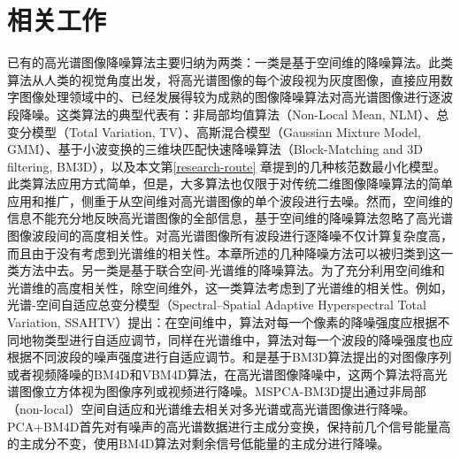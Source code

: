 \documentclass[12pt, a4paper]{article}
\begin{document}
\section{相关工作}\label{related-work}
\par 已有的高光谱图像降噪算法主要归纳为两类：一类是基于空间维的降噪算法。此类算法从人类的视觉角度出发，将高光谱图像的每个波段视为灰度图像，直接应用数字图像处理领域中的、已经发展得较为成熟的图像降噪算法对高光谱图像进行逐波段降噪。这类算法的典型代表有：非局部均值算法（Non-Local Mean, NLM）\cite{NLM}、总变分模型（Total Variation, TV）\cite{TV}、高斯混合模型（Gaussian Mixture Model, GMM）\cite{GMM}、基于小波变换的三维块匹配快速降噪算法（Block-Matching and 3D filtering, BM3D）\cite{BM3D}，以及本文第\ref{research-route} 章提到的几种核范数最小化模型。此类算法应用方式简单，但是，大多算法也仅限于对传统二维图像降噪算法的简单应用和推广，侧重于从空间维对高光谱图像的单个波段进行去噪。然而，空间维的信息不能充分地反映高光谱图像的全部信息，基于空间维的降噪算法忽略了高光谱图像波段间的高度相关性。对高光谱图像所有波段进行逐降噪不仅计算复杂度高，而且由于没有考虑到光谱维的相关性。本章所述的几种降噪方法可以被归类到这一类方法中去。另一类是基于联合空间-光谱维的降噪算法。为了充分利用空间维和光谱维的高度相关性，除空间维外，这一类算法考虑到了光谱维的相关性。例如，光谱-空间自适应总变分模型（Spectral–Spatial Adaptive Hyperspectral Total Variation, SSAHTV）\cite{SSAHTV}提出：在空间维中，算法对每一个像素的降噪强度应根据不同地物类型进行自适应调节，同样在光谱维中，算法对每一个波段的降噪强度也应根据不同波段的噪声强度进行自适应调节。\cite{BM4D}和\cite{VBM4D}是基于BM3D算法提出的对图像序列或者视频降噪的BM4D和VBM4D算法，在高光谱图像降噪中，这两个算法将高光谱图像立方体视为图像序列或视频进行降噪。MSPCA-BM3D\cite{MSPCA-BM3D}提出通过非局部（non-local）空间自适应和光谱维去相关对多光谱或高光谱图像进行降噪。PCA+BM4D\cite{PCAplusBM4D}首先对有噪声的高光谱数据进行主成分变换，保持前几个信号能量高的主成分不变，使用BM4D算法对剩余信号低能量的主成分进行降噪\cite{yaodan}。
	
\end{document}

